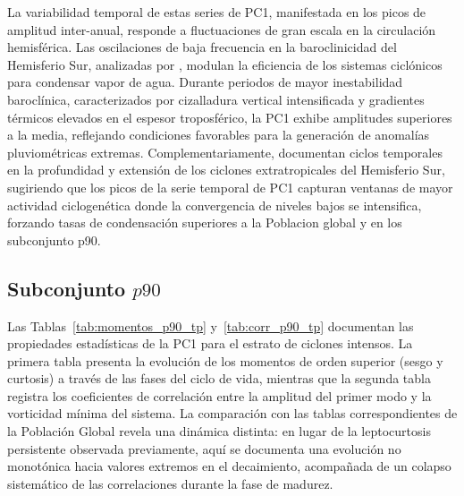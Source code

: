 La variabilidad temporal de estas series de PC1, manifestada en los picos de amplitud inter-anual, responde a fluctuaciones de gran escala en la circulación hemisférica. 
Las oscilaciones de baja frecuencia en la baroclinicidad del Hemisferio Sur, analizadas por \citet{machado2020influence}, modulan la eficiencia de los sistemas ciclónicos para condensar vapor de agua. 
Durante periodos de mayor inestabilidad baroclínica, caracterizados por cizalladura vertical intensificada y gradientes térmicos elevados en el espesor troposférico, la PC1 exhibe amplitudes superiores a la media, reflejando condiciones favorables para la generación de anomalías pluviométricas extremas. 
Complementariamente, \citet{simmonds2000variability} documentan ciclos temporales en la profundidad y extensión de los ciclones extratropicales del Hemisferio Sur, sugiriendo que los picos de la serie temporal de PC1 capturan ventanas de mayor actividad ciclogenética donde la convergencia de niveles bajos se intensifica, forzando tasas de condensación superiores a la Poblacion global y en los subconjunto p90.

\subsection{Subconjunto $p90$}\label{subsubsec:pc1_p90_tp}




Las Tablas~\ref{tab:momentos_p90_tp} y~\ref{tab:corr_p90_tp} documentan las propiedades estadísticas de la PC1 para el estrato de ciclones intensos. La primera tabla presenta la evolución de los momentos de orden superior (sesgo y curtosis) a través de las fases del ciclo de vida, mientras que la segunda tabla registra los coeficientes de correlación entre la amplitud del primer modo y la vorticidad mínima del sistema. 
La comparación con las tablas correspondientes de la Población Global revela una dinámica distinta: en lugar de la leptocurtosis persistente observada previamente, aquí se documenta una evolución no monotónica hacia valores extremos en el decaimiento, acompañada de un colapso sistemático de las correlaciones durante la fase de madurez.

